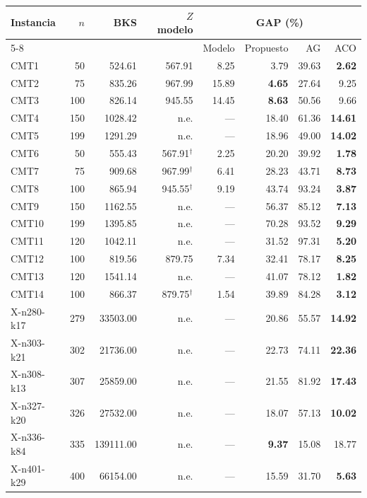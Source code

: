 \begin{table}[htbp]
\centering
\small
\begin{tabular}{lrrrrrrr}
\toprule
Instancia & $n$ & BKS & $Z$ modelo & \multicolumn{4}{c}{GAP (\%)} \\
\cmidrule(lr){5-8}
 & & & & Modelo & Propuesto & AG & ACO \\
\midrule
CMT1 & 50 & 524.61 & 567.91 & 8.25 & 3.79 & 39.63 & \textbf{2.62} \\
CMT2 & 75 & 835.26 & 967.99 & 15.89 & \textbf{4.65} & 27.64 & 9.25 \\
CMT3 & 100 & 826.14 & 945.55 & 14.45 & \textbf{8.63} & 50.56 & 9.66 \\
CMT4 & 150 & 1028.42 & n.e. & --- & 18.40 & 61.36 & \textbf{14.61} \\
CMT5 & 199 & 1291.29 & n.e. & --- & 18.96 & 49.00 & \textbf{14.02} \\
CMT6 & 50 & 555.43 & 567.91$^\dagger$ & 2.25 & 20.20 & 39.92 & \textbf{1.78} \\
CMT7 & 75 & 909.68 & 967.99$^\dagger$ & 6.41 & 28.23 & 43.71 & \textbf{8.73} \\
CMT8 & 100 & 865.94 & 945.55$^\dagger$ & 9.19 & 43.74 & 93.24 & \textbf{3.87} \\
CMT9 & 150 & 1162.55 & n.e. & --- & 56.37 & 85.12 & \textbf{7.13} \\
CMT10 & 199 & 1395.85 & n.e. & --- & 70.28 & 93.52 & \textbf{9.29} \\
CMT11 & 120 & 1042.11 & n.e. & --- & 31.52 & 97.31 & \textbf{5.20} \\
CMT12 & 100 & 819.56 & 879.75 & 7.34 & 32.41 & 78.17 & \textbf{8.25} \\
CMT13 & 120 & 1541.14 & n.e. & --- & 41.07 & 78.12 & \textbf{1.82} \\
CMT14 & 100 & 866.37 & 879.75$^\dagger$ & 1.54 & 39.89 & 84.28 & \textbf{3.12} \\
X-n280-k17 & 279 & 33503.00 & n.e. & --- & 20.86 & 55.57 & \textbf{14.92} \\
X-n303-k21 & 302 & 21736.00 & n.e. & --- & 22.73 & 74.11 & \textbf{22.36} \\
X-n308-k13 & 307 & 25859.00 & n.e. & --- & 21.55 & 81.92 & \textbf{17.43} \\
X-n327-k20 & 326 & 27532.00 & n.e. & --- & 18.07 & 57.13 & \textbf{10.02} \\
X-n336-k84 & 335 & 139111.00 & n.e. & --- & \textbf{9.37} & 15.08 & 18.77 \\
X-n401-k29 & 400 & 66154.00 & n.e. & --- & 15.59 & 31.70 & \textbf{5.63} \\

\end{tabular}
\end{table}
